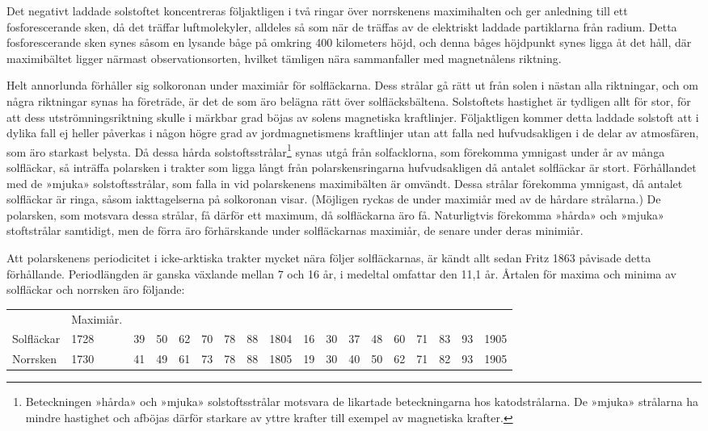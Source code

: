 \documentclass[a4paper, 12pt, oneside, swedish]{article}
\begin{document}
Det negativt laddade solstoftet koncentreras följaktligen i två ringar över norrskenens maximihalten och ger anledning till ett fosforescerande sken, då det träffar luftmolekyler, alldeles så som när de träffas av de elektriskt laddade partiklarna från radium. Detta fosforescerande sken synes såsom en lysande båge på omkring 400 kilometers höjd, och denna båges höjdpunkt synes ligga åt det håll, där maximibältet ligger närmast observationsorten, hvilket tämligen nära sammanfaller med magnetnålens riktning.

Helt annorlunda förhåller sig solkoronan under maximiår för solfläckarna. Dess strålar gå rätt ut från solen i nästan alla riktningar, och om några riktningar synas ha företräde, är det de som äro belägna rätt över solfläcksbältena. Solstoftets hastighet är tydligen allt för stor, för att dess utströmningsriktning skulle i märkbar grad böjas av solens magnetiska kraftlinjer. Följaktligen kommer detta laddade solstoft att i dylika fall ej heller påverkas i någon högre grad av jordmagnetismens kraftlinjer utan att falla ned hufvudsakligen i de delar av atmosfären, som äro starkast belysta. Då dessa hårda solstoftsstrålar\footnote{Beteckningen »hårda» och »mjuka» solstoftsstrålar motsvara de likartade beteckningarna hos katodstrålarna. De »mjuka» strålarna ha mindre hastighet och afböjas därför starkare av yttre krafter till exempel av magnetiska krafter.} synas utgå från solfacklorna, som förekomma ymnigast under år av många solfläckar, så inträffa polarsken i trakter som ligga långt från polarskensringarna hufvudsakligen då antalet solfläckar är stort. Förhållandet med de »mjuka» solstoftsstrålar, som falla in vid polarskenens maximibälten är omvändt. Dessa strålar förekomma ymnigast, då antalet solfläckar är ringa, såsom iakttagelserna på solkoronan visar. (Möjligen ryckas de under maximiår med av de hårdare strålarna.) De polarsken, som motsvara dessa strålar, få därför ett maximum, då solfläckarna äro få. Naturligtvis förekomma »hårda» och »mjuka» stoftstrålar samtidigt, men de förra äro förhärskande under solfläckarnas maximiår, de senare under deras minimiår.

Att polarskenens periodicitet i icke-arktiska trakter mycket nära följer solfläckarnas, är kändt allt sedan Fritz 1863 påvisade detta förhållande. Periodlängden är ganska växlande mellan 7 och 16 år, i medeltal omfattar den 11,1 år. Årtalen för maxima och minima av solfläckar och norrsken äro följande:

\begin{table}[H]
    \centering
    \footnotesize
    \begin{tabular}{p{10mm} p{8mm} p{2mm} p{2mm} p{2mm} p{2mm} p{2mm} p{2mm} p{4mm} p{2mm} p{2mm} p{2mm} p{2mm} p{2mm} p{2mm} p{2mm} p{2mm} p{4mm}}
        ~ & Maximiår.   & ~ & ~ & ~ & ~ & ~ & ~ & ~ & ~ & ~ & ~ & ~ & ~ & ~ & ~ & ~ & ~ \\
        Solfläckar & 1728 & 39 & 50 & 62 & 70 & 78 & 88 & 1804 & 16 & 30 & 37 & 48 & 60 & 71 & 83 & 93 & 1905 \\
        Norrsken & 1730 & 41 & 49 & 61 & 73 & 78 & 88 & 1805 & 19 & 30 & 40 & 50 & 62 & 71 & 82 & 93 & 1905 \\
    \end{tabular}
\end{table}
\end{document}
